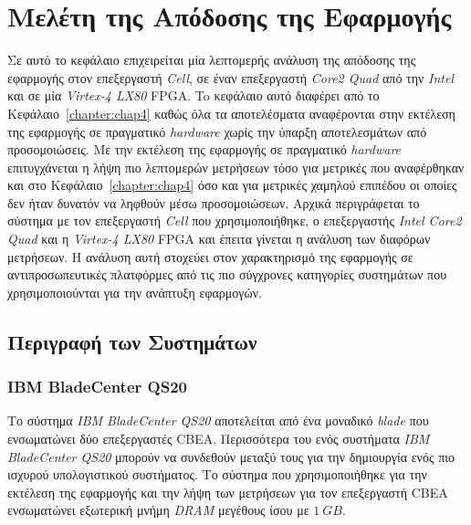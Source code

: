 ﻿\chapter{Μελέτη της Απόδοσης της Εφαρμογής}
\label{chapter:chap6}

Σε αυτό το κεφάλαιο επιχειρείται μία λεπτομερής ανάλυση της απόδοσης της εφαρμογής στον επεξεργαστή \textsl{Cell}, σε έναν επεξεργαστή \textsl{Core2 Quad} από την \textsl{Intel} και σε μία \textsl{Virtex-4 LX80} \ac{FPGA}. To κεφάλαιο αυτό διαφέρει από το Κεφάλαιο~\ref{chapter:chap4} καθώς όλα τα αποτελέσματα αναφέρονται στην εκτέλεση της εφαρμογής σε πραγματικό \textsl{hardware} χωρίς την ύπαρξη αποτελεσμάτων από προσομοιώσεις. Με την εκτέλεση της εφαρμογής σε πραγματικό \textsl{hardware} επιτυγχάνεται η λήψη πιο λεπτομερών μετρήσεων τόσο για μετρικές που αναφέρθηκαν και στο Κεφάλαιο~\ref{chapter:chap4} όσο και για μετρικές χαμηλού επιπέδου οι οποίες δεν ήταν δυνατόν να ληφθούν μέσω προσομοιώσεων. Αρχικά περιγράφεται το σύστημα με τον επεξεργαστή \textsl{Cell} που χρησιμοποιήθηκε, ο επεξεργαστής \textsl{Intel Core2 Quad} και η \textsl{Virtex-4 LX80} \ac{FPGA} και έπειτα γίνεται η ανάλυση των διαφόρων μετρήσεων. Η ανάλυση αυτή στοχεύει στον χαρακτηρισμό της εφαρμογής σε αντιπροσωπευτικές πλατφόρμες από τις πιο σύγχρονες κατηγορίες συστημάτων που χρησιμοποιούνται για την ανάπτυξη εφαρμογών.

\section{Περιγραφή των Συστημάτων}
\label{section:sect61}

\subsection[6.1.1 IBM BladeCenter QS20]{IBM BladeCenter QS20}
\label{subsection:sub611}
\indent
Το σύστημα \textsl{IBM BladeCenter QS20} αποτελείται από ένα μοναδικό \textsl{blade} που ενσωματώνει δύο επεξεργαστές \ac{CBEA}. Περισσότερα του ενός συστήματα \textsl{IBM BladeCenter QS20} μπορούν να συνδεθούν μεταξύ τους για την δημιουργία ενός πιο ισχυρού υπολογιστικού συστήματος. Το σύστημα που χρησιμοποιήθηκε για την εκτέλεση της εφαρμογής και την λήψη των μετρήσεων για τον επεξεργαστή \ac{CBEA} ενσωματώνει εξωτερική μνήμη \textsl{DRAM} μεγέθους ίσου με \(1\ GB\).

